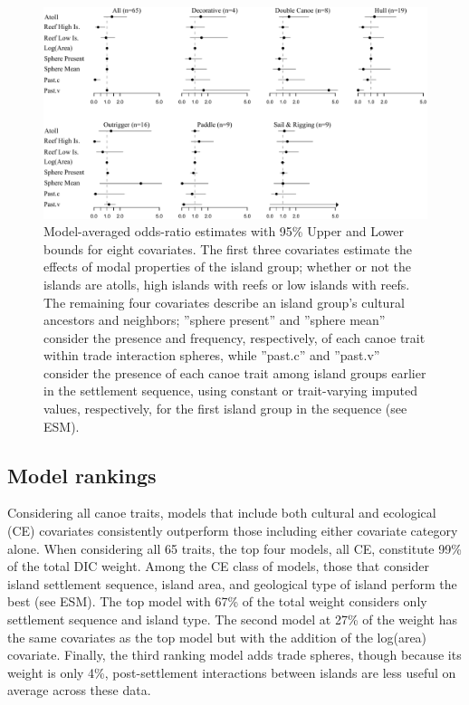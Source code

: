 \documentclass[11pt]{article}
\begin{document}
\begin{figure}[t]
  \begin{center}
    \includegraphics[scale=0.7]{figures/oddsratios.pdf}
  \end{center}
  \caption{Model-averaged odds-ratio estimates with 95\% Upper and Lower bounds for eight covariates. The first three covariates estimate the effects of modal properties of the island group; whether or not the islands are atolls, high islands with reefs or low islands with reefs. The remaining four covariates describe an island group's cultural ancestors and neighbors; ''sphere present'' and ''sphere mean'' consider the presence and frequency, respectively, of each canoe trait within trade interaction spheres, while ''past.c'' and ''past.v'' consider the presence of each canoe trait among island groups earlier in the settlement sequence, using constant or trait-varying imputed values, respectively, for the first island group in the sequence (see ESM).}
  \label{fig:oddsratios}
\end{figure}

\subsection{Model rankings}

Considering all canoe traits, models that include both cultural and ecological (CE) covariates consistently outperform those including either covariate category alone. When considering all 65 traits, the top four models, all CE, constitute 99\% of the total DIC weight. Among the CE class of models, those that consider island settlement sequence, island area, and geological type of island perform the best (see ESM). The top model with 67\% of the total weight considers only settlement sequence and island type. The second model at 27\% of the weight has the same covariates as the top model but with the addition of the log(area) covariate. Finally, the third ranking model adds trade spheres, though because its weight is only 4\%, post-settlement interactions between islands are less useful on average across these data.
\end{document}
